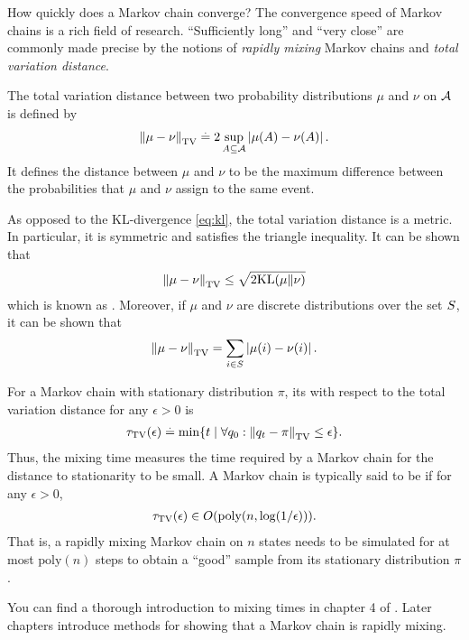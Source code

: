 \begin{rmk}{How quickly does a Markov chain converge?}{}
  The convergence speed of Markov chains is a rich field of research.
  ``Sufficiently long'' and ``very close'' are commonly made precise by the notions of \emph{rapidly mixing} Markov chains and \emph{total variation distance}.

  \begin{defn}
    The total variation distance between two probability distributions $\mu$ and $\nu$ on $\mathcal{A}$ is defined by \begin{align}
      \norm{\mu - \nu}_{\mathrm{TV}} \defeq 2 \sup_{\sA \subseteq \spA} \abs{\mu(\sA) - \nu(\sA)}.
    \end{align}
    It defines the distance between $\mu$ and $\nu$ to be the maximum difference between the probabilities that $\mu$ and $\nu$ assign to the same event.
  \end{defn}
  As opposed to the KL-divergence \eqref{eq:kl}, the total variation distance is a metric.
  In particular, it is symmetric and satisfies the triangle inequality.
  It can be shown that \begin{align}
    \norm{\mu - \nu}_{\mathrm{TV}} \leq \sqrt{2 \KL{\mu}{\nu}} \label{eq:pinsker}
  \end{align} which is known as .
  Moreover, if $\mu$ and $\nu$ are discrete distributions over the set $S$, it can be shown that \begin{align}
    \norm{\mu - \nu}_{\mathrm{TV}} = \sum_{i \in \sS} \abs{\mu(i) - \nu(i)}.
  \end{align}

  \begin{defn}
    For a Markov chain with stationary distribution $\pi$, its  with respect to the total variation distance for any $\epsilon > 0$ is \begin{align}
      \tau_{\mathrm{TV}}(\epsilon) \defeq \min\{t \mid \forall q_0 : \norm{q_t - \pi}_{\mathrm{TV}} \leq \epsilon\}.
    \end{align}
    Thus, the mixing time measures the time required by a Markov chain for the distance to stationarity to be small.
    A Markov chain is typically said to be  if for any $\epsilon > 0$, \begin{align}
      \tau_{\mathrm{TV}}(\epsilon) \in \BigO{\mathrm{poly}(n, \log(1 / \epsilon))}.
    \end{align}
    That is, a rapidly mixing Markov chain on $n$ states needs to be simulated for at most $\mathrm{poly}(n)$ steps to obtain a ``good'' sample from its stationary distribution $\pi$.
  \end{defn}

  You can find a thorough introduction to mixing times in chapter 4 of . Later chapters introduce methods for showing that a Markov chain is rapidly mixing.
\end{rmk}



